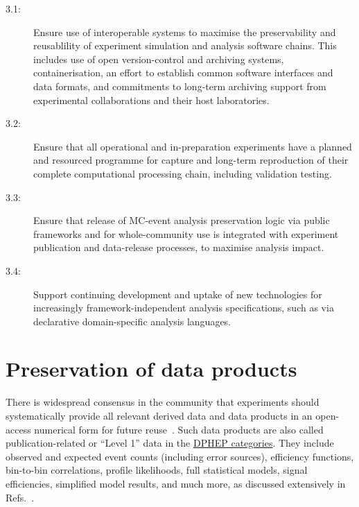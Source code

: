 \documentclass[11pt]{article}
\begin{document}
\begin{description}
   \item[3.1:] Ensure use of interoperable systems to maximise the preservability and reusablility of experiment simulation and analysis software chains. This includes use of open version-control and archiving systems, containerisation, an effort to establish common software interfaces and data formats, and commitments to long-term archiving support from experimental collaborations and their host laboratories.
   
   \item[3.2:] Ensure that all operational and in-preparation experiments have a planned and resourced programme for capture and long-term reproduction of their complete computational processing chain, including validation testing.
   
   \item[3.3:] Ensure that release of MC-event \gls{analysis preservation} logic via public frameworks and for whole-community use is integrated with experiment publication and data-release processes, to maximise analysis impact.
   \item[3.4:] Support continuing development and uptake of new technologies for increasingly framework-independent analysis specifications, such as via declarative domain-specific analysis languages.
   
\end{description}

\section{Preservation of data products}
\label{data-products}

There is widespread consensus in the community that experiments should systematically provide all relevant derived data and data products in an open-access numerical form for future reuse~\cite{LHCReinterpretationForum:2020xtr}. 
Such data products are also called publication-related or ``Level 1'' data in the 
\href{https://opendata.cern.ch/docs/about}{DPHEP categories}. 
They include observed and expected event counts  (including error sources), efficiency functions,  bin-to-bin correlations, profile likelihoods, full statistical models, signal efficiencies, simplified model results, and much more, 
as discussed extensively in Refs.~\cite{LHCReinterpretationForum:2020xtr,Cranmer:2021urp}.
\end{document}
